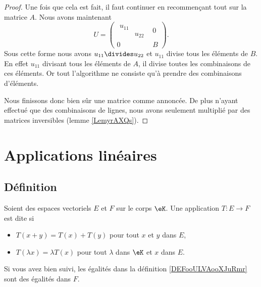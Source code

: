 \begin{proof}
    Une fois que cela est fait, il faut continuer en recommençant tout sur la matrice \( A\). Nous avons maintenant
    \begin{equation}
        U=\begin{pmatrix}
            \begin{matrix}
                u_{11}  &       \\ 
                &   u_{22}    
            \end{matrix}&   0    \\ 
            0    &   B    
        \end{pmatrix}.
    \end{equation}
    Sous cette forme nous avons \( u_{11}\divides u_{22}\) et \( u_{11}\) divise tous les éléments de \( B\). En effet \( u_{11}\) divisant tous les éléments de \( A\), il divise toutes les combinaisons de ces éléments. Or tout l'algorithme ne consiste qu'à prendre des combinaisons d'éléments.

    Nous finissons donc bien sûr une matrice comme annoncée. De plus n'ayant effectué que des combinaisons de lignes, nous avons seulement multiplié par des matrices inversibles (lemme \ref{LemyrAXQs}).
\end{proof}


\section{Applications linéaires}

\subsection{Définition}

\begin{definition}      \label{DEFooULVAooXJuRmr}
    Soient des espaces vectoriels \( E \) et \( F\) sur le corps \( \eK\). Une application \( T\colon E\to F\) est dite  si
    \begin{itemize}
        \item $T(x+y)=T(x)+T(y)$ pour tout $x$ et $y$ dans \( E\),
        \item $T(\lambda x)=\lambda T(x)$ pour tout $\lambda$ dans $\eK$ et \( x\) dans \( E\).
    \end{itemize}
\end{definition}
Si vous avez bien suivi, les égalités dans la définition \ref{DEFooULVAooXJuRmr} sont des égalités dans \( F\).


